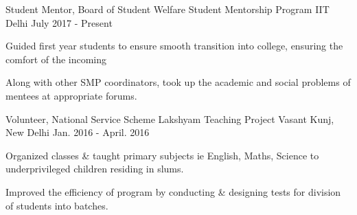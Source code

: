 

\begin{cventries}

  \cventry
    {Student Mentor, Board of Student Welfare} %
    {Student Mentorship Program} %
    {IIT Delhi} %
    {July 2017 - Present} %
    {
      \begin{cvitems} %
        \item {Guided first year students to ensure smooth transition into college, ensuring the comfort of the incoming}
        \item {Along with other SMP coordinators, took up the academic and social problems of mentees at appropriate forums.}
      \end{cvitems}
    }

  \cventry
    {Volunteer, National Service Scheme} %
    {Lakshyam Teaching Project} %
    {Vasant Kunj, New Delhi} %
    {Jan. 2016 - April. 2016} %
    {
      \begin{cvitems} %
        \item {Organized classes \& taught primary subjects ie English, Maths, Science to underprivileged children residing in slums.}
        \item {Improved the efficiency of program by conducting \& designing tests for division of students into batches.}
      \end{cvitems}
    }

\end{cventries}
